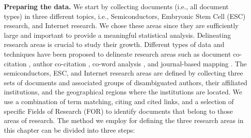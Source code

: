 \documentclass[draft,final]{vutinfth} %
\begin{document}
\textbf{Preparing the data.}
\noindent
We start by collecting documents (i.e., all document types) in three different topics, i.e., Semiconductors, Embryonic Stem Cell (ESC) research, and Internet research. 
We chose these areas since they are sufficiently large and important to provide a meaningful statistical analysis. 
Delineating research areas is crucial to study their growth. Different types of data and techniques have been proposed to delineate research areas such as document co-citation \cite{small1973co}, author co-citation \cite{white1981author}, co-word analysis \cite{callon1983translations}, and journal-based mapping \cite{leydesdorff2004clusters}. 
The semiconductors, ESC, and Internet research areas are defined by collecting three sets of documents and associated groups of disambiguated authors, their affiliated institutions, and the geographical regions where the institutions are located. 
We use a combination of term matching, citing and cited links, and a selection of specific Fields of Research (FOR) to identify documents that belong to those areas of research. The method we employ for defining the three research areas in this chapter can be divided into three steps:\\
\end{document}

